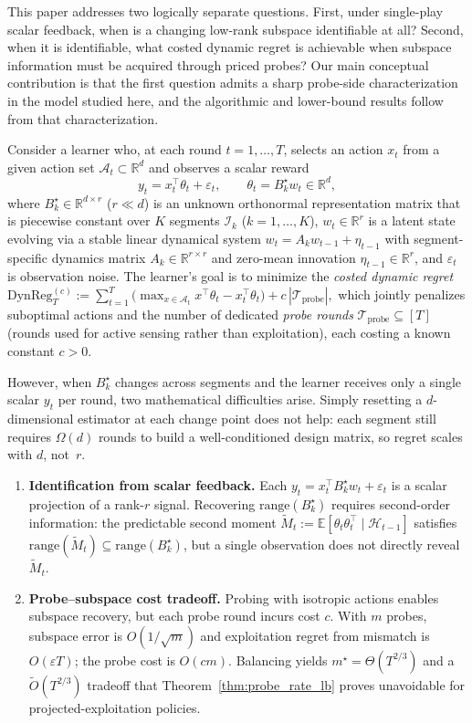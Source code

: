 \documentclass{article}
\newcommand{\R}{\mathbb{R}}
\newcommand{\E}{\mathbb{E}}
\newcommand{\cA}{\mathcal{A}}
\newcommand{\cH}{\mathcal{H}}
\newcommand{\cI}{\mathcal{I}}
\newcommand{\cTprobe}{\mathcal{T}_{\mathrm{probe}}}
\newcommand{\DynReg}{\mathrm{DynReg}}
\newcommand{\range}{\mathrm{range}}
\begin{document}
  This paper addresses two logically separate questions.
  First, under single-play scalar feedback, when is a changing low-rank subspace identifiable at all?
  Second, when it is identifiable, what costed dynamic regret is achievable when subspace information must be acquired through priced probes?
  Our main conceptual contribution is that the first question admits a sharp probe-side characterization in the model studied here, and the algorithmic and lower-bound results follow from that characterization.

  Consider a learner who, at each round $t = 1, \ldots, T$, selects
  an action $x_t$ from a given action set $\cA_t \subset \R^d$ and
  observes a scalar reward
  \begin{equation}
  y_t = x_t^\top \theta_t + \varepsilon_t, \qquad
  \theta_t = B_k^\star w_t \in \R^d, \label{eq:intro_model}
  \end{equation}
  where $B_k^\star \in \R^{d \times r}$ ($r \ll d$) is an unknown
  orthonormal representation matrix that is piecewise constant over
  $K$ segments $\cI_k$ ($k = 1, \ldots, K$), $w_t \in \R^r$ is
  a latent state evolving via a stable linear dynamical system
  $w_t = A_k w_{t-1} + \eta_{t-1}$ with segment-specific dynamics
  matrix $A_k \in \R^{r \times r}$ and zero-mean innovation
  $\eta_{t-1} \in \R^r$, and $\varepsilon_t$ is observation noise.
  The learner's goal is to minimize the \emph{costed dynamic regret}
  $\DynReg_T^{(c)} := \sum_{t=1}^T \bigl(\max_{x \in \cA_t}
  x^\top\theta_t - x_t^\top\theta_t\bigr) + c\,|\cTprobe|,$
  which jointly penalizes suboptimal actions and the number of
  dedicated \emph{probe rounds} $\cTprobe \subseteq [T]$
  (rounds used for active sensing rather than exploitation), each
  costing a known constant $c > 0$.

 However, when $B_k^\star$ changes across segments and the learner
receives only a single scalar $y_t$ per round, two mathematical
difficulties arise.
Simply resetting a $d$-dimensional estimator at each change point
does not help: each segment still requires $\Omega(d)$ rounds to
build a well-conditioned design matrix, so regret scales with $d$,
not~$r$.
  \begin{enumerate}[nosep,leftmargin=2em]
  \item \textbf{Identification from scalar feedback.}
  Each $y_t = x_t^\top B_k^\star w_t + \varepsilon_t$ is a scalar projection of a rank-$r$ signal.
  Recovering $\range(B_k^\star)$ requires second-order information: the predictable second moment
  $\widetilde{M}_t := \E[\theta_t\theta_t^\top \mid \cH_{t-1}]$ satisfies
  $\range(\widetilde{M}_t) \subseteq \range(B_k^\star)$, but a single observation does not directly reveal $\widetilde{M}_t$.
  \item \textbf{Probe--subspace cost tradeoff.}
  Probing with isotropic actions enables subspace recovery, but each probe round incurs cost $c$.
  With $m$ probes, subspace error is $O(1/\sqrt{m})$ and exploitation regret from mismatch is $O(\varepsilon T)$; the probe cost is $O(cm)$.
  Balancing yields $m^\star = \Theta(T^{2/3})$ and a $\widetilde{O}(T^{2/3})$ tradeoff that Theorem~\ref{thm:probe_rate_lb} proves unavoidable for projected-exploitation policies.
  \end{enumerate}
\end{document}
